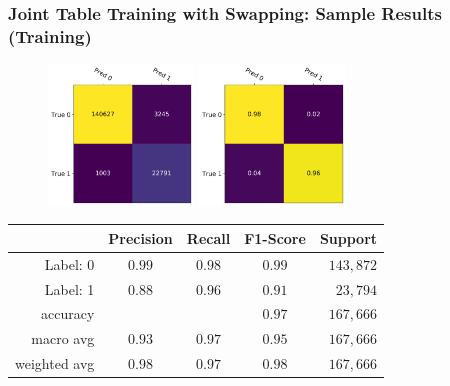 \documentclass[usenames,dvipsnames]{beamer}
\begin{document}
\begin{frame}
  \frametitle{Joint Table Training with Swapping: Sample Results (Training)}
  \begin{figure}
    \centering
    \includegraphics[height=3.75cm, valign=c]{assets/swap_cm_table_train}
    \includegraphics[height=3.75cm, valign=c]{assets/swap_cm_table_norm_train}
  \end{figure}
  \begin{center}
    \begin{tabular}{rcccr}
    \toprule
    {} &  Precision &  Recall &  F1-Score & Support \\
    \midrule
    Label: 0 & $0.99$ & $0.98$ & $0.99$ & $143,872$ \\
    Label: 1 & $0.88$ & $0.96$ & $0.91$ & $23,794$ \\
    \midrule
    accuracy & {} & {} & $0.97$ & $167,666$ \\
    macro avg & $0.93$ & $0.97$ & $0.95$ & $167,666$ \\
    weighted avg & $0.98$ & $0.97$ & $0.98$ & $167,666$ \\
    \bottomrule
    \end{tabular}
  \end{center}
\end{frame}
\end{document}
